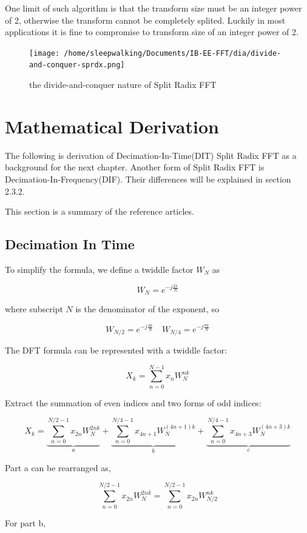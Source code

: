 \documentclass[a4paper]{report}
\begin{document}
	One limit of such algorithm is that the transform size must be an integer power of 2, otherwise the transform cannot be completely splited. Luckily in most applications it is fine to compromise to transform size of an integer power of 2.
	
	\begin{figure}[htp]
		\centering
		\texttt{[image: /home/sleepwalking/Documents/IB-EE-FFT/dia/divide-and-conquer-sprdx.png]}
		\caption{the divide-and-conquer nature of Split Radix FFT}
	\end{figure}

\section{Mathematical Derivation} \indent

	The following is derivation of Decimation-In-Time(DIT) Split Radix FFT as a background for the next chapter. Another form of Split Radix FFT is Decimation-In-Frequency(DIF). Their differences will be explained in section 2.3.2.
	
	This section is a summary of the reference articles. %

\subsection{Decimation In Time} \indent

	To simplify the formula, we define a twiddle factor $W_N$ as
	
	\[W_N = e^{-j\frac{2\pi}{N}}\]
	
	where subscript $N$ is the denominator of the exponent, so 
	
	\[W_{N/2} = e^{-j\frac{4\pi}{N}} \quad W_{N/4} = e^{-j\frac{8\pi}{N}}\]

	The DFT formula can be represented with a twiddle factor:
	
	\[X_k = \sum^{N-1}_{n=0} x_n W_N^{nk}\]

	Extract the summation of even indices and two forms of odd indices:
	
	\[X_k = \underbrace{\sum^{N/2-1}_{n=0} x_{2n} W_{N}^{2nk}}_a
	      + \underbrace{\sum^{N/4-1}_{n=0} x_{4n+1} W_{N}^{(4n+1)k}}_b
	      + \underbrace{\sum^{N/4-1}_{n=0} x_{4n+3} W_{N}^{(4n+3)k}}_c\]

	Part a can be rearranged as,
	
	\[\sum^{N/2-1}_{n=0} x_{2n} W_{N}^{2nk} = \sum^{N/2-1}_{n=0} x_{2n} W_{N/2}^{nk}\]
	
	For part b,
	
\end{document}

